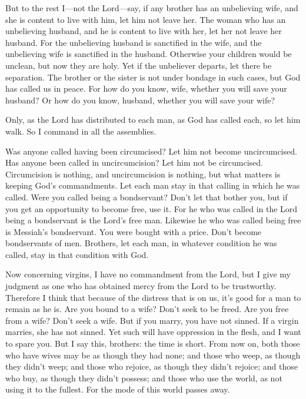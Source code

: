 \myverse{}But to the rest I—not the Lord—say, if any brother has an unbelieving
wife, and she is content to live with him, let him not leave her.
\myverse{}The woman who has an unbelieving husband, and he is content to live with her,
let her not leave her husband.
\myverse{}For the unbelieving husband is sanctified in the wife, and the unbelieving
wife is sanctified in the husband. Otherwise your children would be unclean, but now they are holy.
\myverse{}Yet if the unbeliever departs, let there be separation. The brother or the
sister is not under bondage in such cases, but God has called us in peace.
\myverse{}For how do you know, wife, whether you will save your husband? Or how do you
know, husband, whether you will save your wife?

\myverse{}Only, as the Lord has distributed to each man, as God has called
each, so let him walk. So I command in all the assemblies.

\myverse{}Was anyone called having been circumcised? Let him not become
uncircumcised. Has anyone been called in uncircumcision? Let him not be circumcised.
\myverse{}Circumcision is nothing, and uncircumcision is nothing, but what matters is
keeping God’s commandments.
\myverse{}Let each man stay in that calling in which he was called.
\myverse{}Were you called being a bondservant? Don’t let that bother you, but if you
get an opportunity to become free, use it.
\myverse{}For he who was called in the Lord being a bondservant is the Lord’s free man.
Likewise he who was called being free is Messiah’s bondservant.
\myverse{}You were bought with a price. Don’t become bondservants of men.
\myverse{}Brothers, let each man, in whatever condition he was called, stay in that
condition with God.

\myverse{}Now concerning virgins, I have no commandment from the Lord,
but I give my judgment as one who has obtained mercy from the Lord to be trustworthy.
\myverse{}Therefore I think that because of the distress that is on us, it’s good for
a man to remain as he is.
\myverse{}Are you bound to a wife? Don’t seek to be freed. Are you free from a wife?
Don’t seek a wife.
\myverse{}But if you marry, you have not sinned. If a virgin marries, she has not sinned.
Yet such will have oppression in the flesh, and I want to spare you.
\myverse{}But I say this, brothers: the time is short. From now on, both those who have
wives may be as though they had none;
\myverse{}and those who weep, as though they didn’t weep; and those who rejoice, as
though they didn’t rejoice; and those who buy, as though they didn’t possess;
\myverse{}and those who use the world, as not using it to the fullest. For the mode
of this world passes away.

